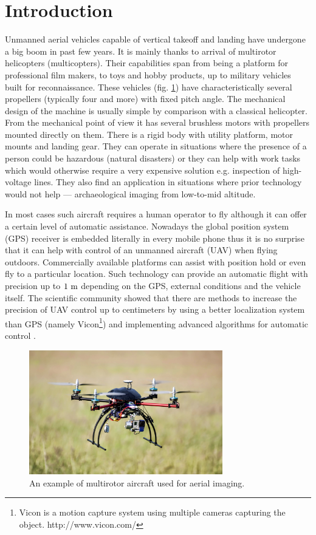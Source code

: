 \section{Introduction}

Unmanned aerial vehicles capable of vertical takeoff and landing have undergone a big boom in past few years. It is mainly thanks to arrival of multirotor helicopters (multicopters). Their capabilities span from being a platform for professional film makers, to toys and hobby products, up to military vehicles built for reconnaissance. These vehicles (fig. \ref{fig:quadru1}) have characteristically several propellers (typically four and more) with fixed pitch angle. The mechanical design of the machine is usually simple by comparison with a classical helicopter. From the mechanical point of view it has several brushless motors with propellers mounted directly on them. There is a rigid body with utility platform, motor mounts and landing gear. They can operate in situations where the presence of a person could be hazardous (natural disasters) or they can help with work tasks which would otherwise require a very expensive solution e.g. inspection of high-voltage lines. They also find an application in situations where prior technology would not help --- archaeological imaging from low-to-mid altitude.

In most cases such aircraft requires a human operator to fly although it can offer a certain level of automatic assistance. Nowadays the global position system (GPS) receiver is embedded literally in every mobile phone thus it is no surprise that it can help with control of an unmanned aircraft (UAV) when flying outdoors. Commercially available platforms can assist with position hold or even fly to a particular location. Such technology can provide an automatic flight with precision up to $1 ~\mathrm{m}$ depending on the GPS, external conditions and the vehicle itself. The scientific community showed that there are methods to increase the precision of UAV control up to centimeters by using a better localization system than GPS (namely Vicon\footnote{Vicon is a motion capture system using multiple cameras capturing the object. http://www.vicon.com/}) and implementing advanced algorithms for automatic control \citep{brescianini2013polearobatics, kumar2010grasp}.

\begin{figure}[h]
\centering
\includegraphics[width=0.75\textwidth]{fig/quadru1.jpg}
\caption{An example of multirotor aircraft used for aerial imaging.}
\label{fig:quadru1}
\end{figure}

